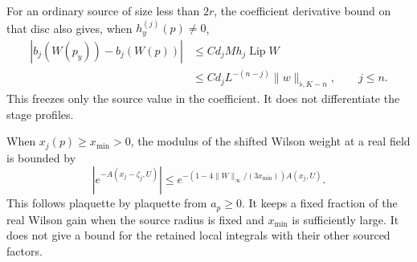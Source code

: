 \documentclass[11pt,letterpaper,reqno]{amsart}
\numberwithin{equation}{section}
\theoremstyle{definition}
\theoremstyle{remark}
\begin{document}
For an ordinary source of size less than $2r$, the coefficient
derivative bound on that disc also gives, when $h_y^{(j)}(p)\ne0$,
\[
 \begin{split}
 |b_j(W(p_y))-b_j(W(p))|
 &\le C d_j M h_j\operatorname{Lip}W\\
 &\le C d_jL^{-(n-j)}\|w\|_{\flat,K-n},\qquad j\le n.
 \end{split}
\]
This freezes only the source value in the coefficient. It does
not differentiate the stage profiles.

When $x_j(p)\ge x_{\min}>0$, the modulus of the shifted Wilson weight
at a real field is bounded by
\begin{equation}\label{si:eq-real-wilson-source}
 |e^{-A(x_j-\zeta_j,U)}|
  \le e^{-(1-4\|W\|_\infty/(3x_{\min}))A(x_j,U)}.
\end{equation}
This follows plaquette by plaquette from $a_p\ge0$. It keeps a fixed
fraction of the real Wilson gain when the source radius is fixed
and $x_{\min}$ is sufficiently large. It does not give a bound for
the retained local integrals with their other sourced factors.
\end{document}
